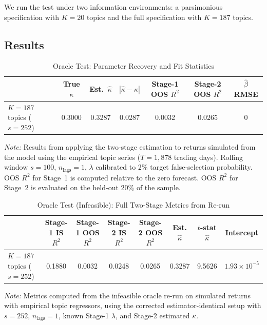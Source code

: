 \documentclass[11pt]{article}
\begin{document}
We run the test under two information environments: a parsimonious specification with
$K = 20$ topics and the full specification with $K = 187$ topics.

\subsection*{Results}

\begin{table}[H]
\centering
\caption{Oracle Test: Parameter Recovery and Fit Statistics}
\label{tab:oracle}
\begin{tabularx}{\textwidth}{@{}>{\small}lcccccc@{}}
\toprule
 & \multicolumn{1}{c}{True $\kappa$}
 & \multicolumn{1}{c}{Est.\ $\hat\kappa$}
 & \multicolumn{1}{c}{$|\hat\kappa - \kappa|$}
 & \multicolumn{1}{c}{Stage-1 OOS $R^2$}
 & \multicolumn{1}{c}{Stage-2 OOS $R^2$}
 & \multicolumn{1}{c}{$\hat\beta$ RMSE} \\
\midrule
$K = 187$ topics ($s=252$) & 0.3000 & 0.3287 & 0.0287 & 0.0032 & 0.0265 & $0$ \\
\bottomrule
\end{tabularx}
\medskip
\begin{minipage}{\textwidth}
\footnotesize
\textit{Note:} Results from applying the two-stage estimation to returns simulated from the
model using the empirical topic series ($T = 1{,}878$ trading days).
Rolling window $s = 100$, $n_{\text{lags}} = 1$, $\lambda$ calibrated to 2\% target
false-selection probability.
OOS $R^2$ for Stage~1 is computed relative to the zero forecast.
OOS $R^2$ for Stage~2 is evaluated on the held-out 20\% of the sample.
\end{minipage}
\end{table}

\begin{table}[H]
\centering
\caption{Oracle Test (Infeasible): Full Two-Stage Metrics from Re-run}
\label{tab:oracle_full_metrics}
\begin{tabularx}{\textwidth}{@{}>{\small}lccccccc@{}}
\toprule
 & \multicolumn{1}{c}{Stage-1 IS $R^2$}
 & \multicolumn{1}{c}{Stage-1 OOS $R^2$}
 & \multicolumn{1}{c}{Stage-2 IS $R^2$}
 & \multicolumn{1}{c}{Stage-2 OOS $R^2$}
 & \multicolumn{1}{c}{Est. $\hat\kappa$}
 & \multicolumn{1}{c}{$t$-stat $\hat\kappa$}
 & \multicolumn{1}{c}{Intercept} \\
\midrule
$K = 187$ topics ($s=252$) & 0.1880 & 0.0032 & 0.0248 & 0.0265 & 0.3287 & 9.5626 & $1.93 \times 10^{-5}$ \\
\bottomrule
\end{tabularx}
\medskip
\begin{minipage}{\textwidth}
\footnotesize
\textit{Note:} Metrics computed from the infeasible oracle re-run on simulated returns with empirical topic regressors, using the corrected estimator-identical setup with $s=252$, $n_{\text{lags}}=1$, known Stage-1 $\lambda$, and Stage-2 estimated $\kappa$.
\end{minipage}
\end{table}
\end{document}
